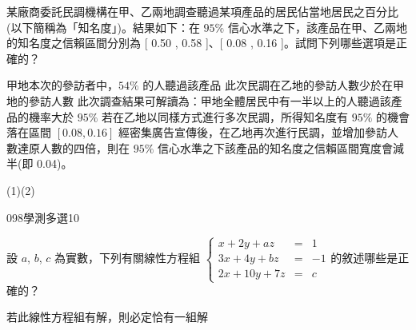 \begin{QUESTIONS}
\begin{QUESTION}
        \begin{ExamAnsRateInfo}{7}{6}{8}{7}
        \end{ExamAnsRateInfo}
        \begin{QBODY}
			某廠商委託民調機構在甲、乙兩地調查聽過某項產品的居民佔當地居民之百分比(以下簡稱為「知名度」)。結果如下：在 $95\%$ 信心水準之下，該產品在甲、乙兩地的知名度之信賴區間分別為 [ 0.50 , 0.58 ]、[ 0.08 , 0.16 ]。試問下列哪些選項是正確的？ 
		\begin{QOPS} 
			\QOP 甲地本次的參訪者中，$54\%$ 的人聽過該產品 
			\QOP 此次民調在乙地的參訪人數少於在甲地的參訪人數 
			\QOP 此次調查結果可解讀為：甲地全體居民中有一半以上的人聽過該產品的機率大於 $95\%$    
			\QOP 若在乙地以同樣方式進行多次民調，所得知名度有 $95\%$ 的機會落在區間 $[0.08 , 0.16 ]$    \QOP 經密集廣告宣傳後，在乙地再次進行民調，並增加參訪人數達原人數的四倍，則在 $95\%$ 
		信心水準之下該產品的知名度之信賴區間寬度會減半(即 0.04)。
		\end{QOPS}
        \end{QBODY}
        \begin{QFROMS}
        \end{QFROMS}
        \begin{QTAGS}\end{QTAGS}
        \begin{QANS}
            (1)(2)
        \end{QANS}
        \begin{QSOLLIST}
        \end{QSOLLIST}
        \begin{QEMPTYSPACE}
        \end{QEMPTYSPACE}
    \end{QUESTION}
    \begin{QUESTION}
        \begin{ExamInfo}{098}{學測}{多選}{10}
        \end{ExamInfo}
        \begin{ExamAnsRateInfo}{8}{11}{6}{7}
        \end{ExamAnsRateInfo}
        \begin{QBODY}
			設 $a$, $b$, $c$ 為實數，下列有關線性方程組 $\left\{ \begin{array}{rlc}x+2y+az &=&1 \\ 3x+4y+bz &=& -1 \\ 2x+10y+7z &=& c  \end{array}\right.$的敘述哪些是正確的？
			\begin{QOPS} 
				\QOP 若此線性方程組有解，則必定恰有一組解 

\end{QOPS}
\end{QBODY}
\end{QUESTION}
\end{QUESTIONS}
